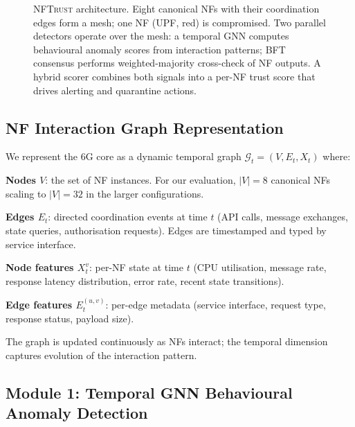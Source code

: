 \documentclass[sigconf,nonacm]{acmart}
\begin{document}
\begin{figure}[t]
\caption{\textsc{NFTrust} architecture. Eight canonical NFs with their
  coordination edges form a mesh; one NF (UPF, red) is compromised.
  Two parallel detectors operate over the mesh: a temporal GNN
  computes behavioural anomaly scores from interaction patterns; BFT
  consensus performs weighted-majority cross-check of NF outputs.
  A hybrid scorer combines both signals into a per-NF trust score
  that drives alerting and quarantine actions.}
\label{fig:framework}
\end{figure}

\subsection{NF Interaction Graph Representation}

We represent the 6G core as a dynamic temporal graph
$\mathcal{G}_t = (V, E_t, X_t)$ where:

\textbf{Nodes $V$}: the set of NF instances. For our evaluation,
$|V| = 8$ canonical NFs scaling to $|V| = 32$ in the larger
configurations.

\textbf{Edges $E_t$}: directed coordination events at time $t$
(API calls, message exchanges, state queries, authorisation
requests). Edges are timestamped and typed by service interface.

\textbf{Node features $X_t^v$}: per-NF state at time $t$ (CPU
utilisation, message rate, response latency distribution, error
rate, recent state transitions).

\textbf{Edge features $E_t^{(u,v)}$}: per-edge metadata (service
interface, request type, response status, payload size).

The graph is updated continuously as NFs interact; the temporal
dimension captures evolution of the interaction pattern.

\subsection{Module 1: Temporal GNN Behavioural Anomaly Detection}
\end{document}
